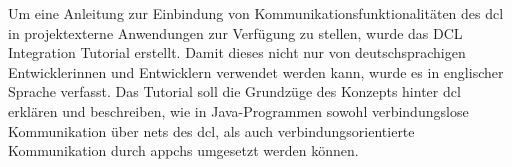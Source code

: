 
Um eine Anleitung zur Einbindung von Kommunikationsfunktionalitäten des
\gls{dcl} in projektexterne Anwendungen zur Verfügung zu stellen, wurde das
DCL Integration Tutorial erstellt.
Damit dieses nicht nur von deutschsprachigen Entwicklerinnen und Entwicklern
verwendet werden kann, wurde es in englischer Sprache verfasst.
Das Tutorial soll die Grundzüge des Konzepts hinter \gls{dcl} erklären und
beschreiben, wie in Java-Programmen sowohl verbindungslose Kommunikation über
\glspl{net} des \gls{dcl}, als auch verbindungsorientierte Kommunikation durch
\glspl{appch} umgesetzt werden können.
